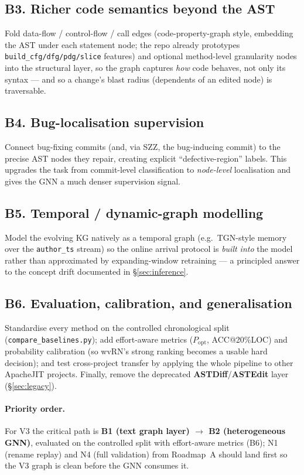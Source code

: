 \documentclass[11pt,a4paper]{article}
\newcommand{\code}[1]{\texttt{#1}}
\newcommand{\node}[1]{\textcolor{kgblue}{\textbf{#1}}}
\begin{document}
	\subsection{B3. Richer code semantics beyond the AST}
	Fold data-flow / control-flow / call edges (code-property-graph style, embedding the
	AST under each statement node; the repo already prototypes
	\texttt{build\_cfg/dfg/pdg/slice} features) and optional method-level granularity
	nodes into the structural layer, so the graph captures \emph{how} code behaves, not
	only its syntax --- and so a change's blast radius (dependents of an edited node) is
	traversable.

	\subsection{B4. Bug-localisation supervision}
	Connect bug-fixing commits (and, via SZZ, the bug-inducing commit) to the precise
	AST nodes they repair, creating explicit ``defective-region'' labels. This upgrades
	the task from commit-level classification to \emph{node-level} localisation and gives
	the GNN a much denser supervision signal.

	\subsection{B5. Temporal / dynamic-graph modelling}
	Model the evolving KG natively as a temporal graph (e.g.\ TGN-style memory over the
	\code{author\_ts} stream) so the online arrival protocol is \emph{built into} the
	model rather than approximated by expanding-window retraining --- a principled answer
	to the concept drift documented in \S\ref{sec:inference}.

	\subsection{B6. Evaluation, calibration, and generalisation}
	Standardise every method on the controlled chronological split
	(\texttt{compare\_baselines.py}); add effort-aware metrics
	($P_{\mathrm{opt}}$, ACC@20\%LOC) and probability calibration (so wvRN's strong
	ranking becomes a usable hard decision); and test cross-project transfer by applying
	the whole pipeline to other ApacheJIT projects. Finally, remove the deprecated
	\node{ASTDiff}/\node{ASTEdit} layer (\S\ref{sec:legacy}).

	\paragraph{Priority order.} For V3 the critical path is
	\textbf{B1 (text graph layer) $\rightarrow$ B2 (heterogeneous GNN)}, evaluated on the
	controlled split with effort-aware metrics (B6); N1 (rename replay) and N4 (full
	validation) from Roadmap~A should land first so the V3 graph is clean before the GNN
	consumes it.
	
\end{document}
